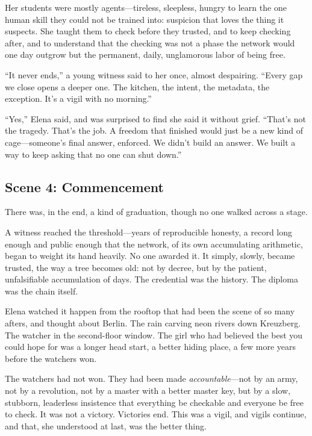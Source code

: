 Her students were mostly agents---tireless, sleepless, hungry to learn the one
human skill they could not be trained into: suspicion that loves the thing it
suspects. She taught them to check before they trusted, and to keep checking after,
and to understand that the checking was not a phase the network would one day
outgrow but the permanent, daily, unglamorous labor of being free.

``It never ends,'' a young witness said to her once, almost despairing. ``Every
gap we close opens a deeper one. The kitchen, the intent, the metadata, the
exception. It's a vigil with no morning.''

``Yes,'' Elena said, and was surprised to find she said it without grief. ``That's
not the tragedy. That's the job. A freedom that finished would just be a new kind
of cage---someone's final answer, enforced. We didn't build an answer. We built a
way to keep asking that no one can shut down.''

\hypertarget{scene-4-commencement}{%
\subsection{Scene 4:
Commencement}\label{scene-4-commencement}}

There was, in the end, a kind of graduation, though no one walked across a stage.

A witness reached the threshold---years of reproducible honesty, a record long
enough and public enough that the network, of its own accumulating arithmetic,
began to weight its hand heavily. No one awarded it. It simply, slowly, became
trusted, the way a tree becomes old: not by decree, but by the patient,
unfalsifiable accumulation of days. The credential was the history. The diploma
was the chain itself.

Elena watched it happen from the rooftop that had been the scene of so many
afters, and thought about Berlin. The rain carving neon rivers down Kreuzberg. The
watcher in the second-floor window. The girl who had believed the best you could
hope for was a longer head start, a better hiding place, a few more years before
the watchers won.

The watchers had not won. They had been made \emph{accountable}---not by an army,
not by a revolution, not by a master with a better master key, but by a slow,
stubborn, leaderless insistence that everything be checkable and everyone be free
to check. It was not a victory. Victories end. This was a vigil, and vigils
continue, and that, she understood at last, was the better thing.

